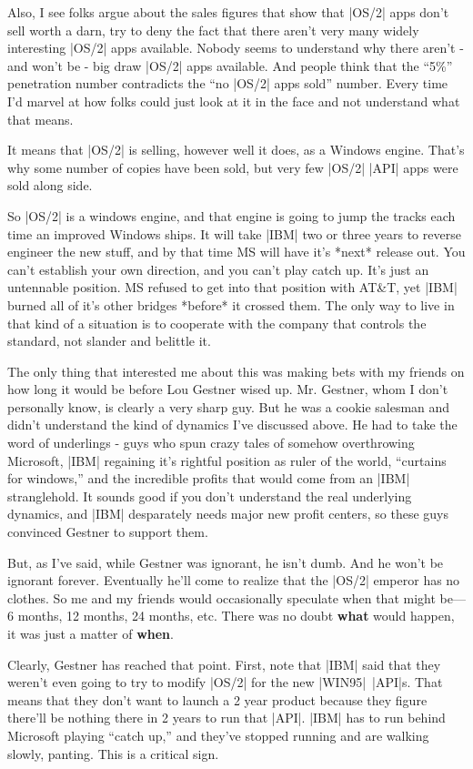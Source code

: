 Also, I see folks argue about the sales figures
that show that |OS/2| apps don't sell worth a darn, try to deny the fact that
there aren't very many widely interesting |OS/2| apps available.  Nobody
seems to understand why there aren't - and won't be - big draw |OS/2| apps
available.  And people think that the ``5\%'' penetration number contradicts
the ``no |OS/2| apps sold'' number.  Every time I'd marvel at how folks
could just look at it in the face and not understand what that means.

It means that |OS/2| is selling, however well it does, as a Windows engine.
That's why some number of copies have been sold, but very few |OS/2|
|API| apps were sold along side.

So |OS/2| is a windows engine, 
and that engine is going to jump the tracks each time an improved
Windows ships.  It will take |IBM| two or three years to reverse engineer
the new stuff, and by that time MS will have it's *next* release out.
You can't establish your own direction, and you can't play catch up.
It's just an untennable position.  MS refused to get into that position
with AT\&T, yet |IBM| burned all of it's other bridges *before* it crossed
them.  The only way to live in that kind of a situation is to cooperate
with the company that controls the standard, not slander and belittle it.

The only thing that interested me about this was making bets with my friends 
on how long it would be before Lou Gestner wised up.  Mr. Gestner, whom
I don't personally know, is clearly a very sharp guy.  But he was a
cookie salesman and didn't understand the kind of dynamics I've discussed
above.  He had to take the word of underlings - guys who spun crazy
tales of somehow overthrowing Microsoft, |IBM| regaining it's rightful
position as ruler of the world, ``curtains for windows,'' and the 
incredible profits that would come from an |IBM| stranglehold.  It sounds
good if you don't understand the real underlying dynamics, and |IBM|
desparately needs major new profit centers, so these guys convinced
Gestner to support them.  

But, as I've said, while Gestner was ignorant, he isn't dumb.  And he
won't be ignorant forever.  Eventually he'll come to realize that
the |OS/2| emperor has no clothes.  So me and my friends would occasionally
speculate when that might be---6 months, 12 months, 24 months, etc.
There was no doubt {\bf what} would happen, it was just a matter of
{\bf when}.

Clearly, Gestner has reached that point.  First, note that |IBM| said that
they weren't even going to try to modify |OS/2| for the new |WIN95|~|API|s.
That means that they don't want to launch a 2 year product because
they figure there'll be nothing there in 2 years to run that |API|.
|IBM| has to run behind Microsoft playing ``catch up,'' and they've stopped
running and are walking slowly, panting.  This is a critical sign.

